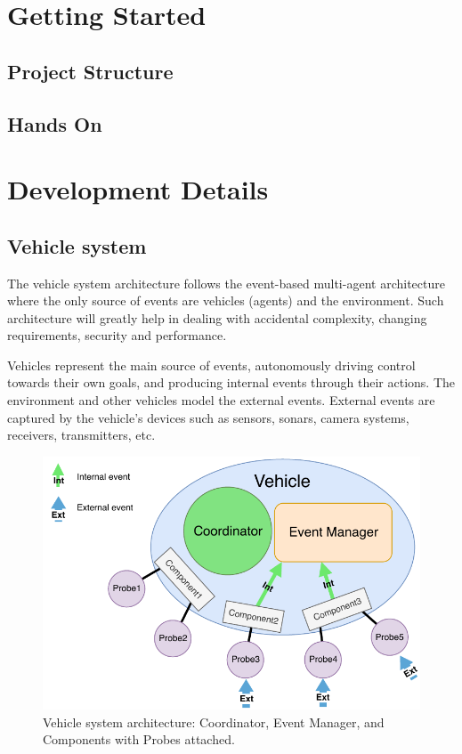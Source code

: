 \documentclass{memoir}
\begin{document}
\section{Getting Started}
\subsection{Project Structure}
\subsection{Hands On}

\section{Development Details}

\subsection{Vehicle system}

The vehicle system architecture follows the event-based multi-agent architecture where the only source of events are vehicles (agents) and the environment.
Such architecture will greatly help in dealing with accidental complexity, changing requirements, security and performance.


Vehicles represent the main source of events, autonomously driving control towards their own goals, and producing internal events through their actions.
The environment and other vehicles model the external events. External events are captured by the vehicle's devices such as sensors, sonars, camera systems, receivers, transmitters, etc.

\begin{figure}
	\centering
	\includegraphics[width=0.7\linewidth]{implementation_details/vehicle_high-level_architecture.pdf}
	\caption{Vehicle system architecture: Coordinator, Event Manager, and Components with Probes attached.}
	\label{fig:vehicle-architecture}
\end{figure}
\end{document}
